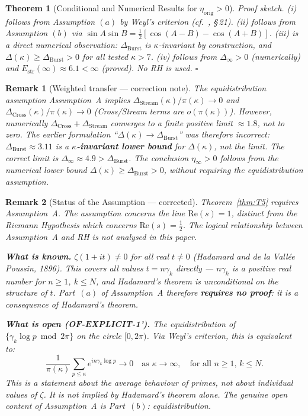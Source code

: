 \documentclass[11pt]{article}
\newtheorem{theorem}{Theorem}[section]
\newtheorem*{remark}{Remark}
\newcommand{\Estr}{E_{\mathrm{str}}}
\newcommand{\etaorig}{\eta_{\mathrm{orig}}}
\newcommand{\Dburstvar}{\Delta_{\mathrm{Burst}}}
\newcommand{\Dcross}{\Delta_{\mathrm{Cross}}}
\newcommand{\Dstream}{\Delta_{\mathrm{Stream}}}
\begin{document}
\begin{theorem}[Conditional and Numerical Results for $\etaorig > 0$]
\emph{Proof sketch.}
(i) follows from Assumption $(a)$ by Weyl's criterion
(cf.\ \cite{IK04}, \S\,21).
(ii) follows from Assumption $(b)$ via
$\sin A\sin B = \tfrac{1}{2}[\cos(A-B)-\cos(A+B)]$.
(iii) is a direct numerical observation: $\Dburstvar$ is $\kappa$-invariant
by construction, and $\Delta(\kappa)\geq\Dburstvar > 0$ for all tested
$\kappa > 7$.
(iv) follows from $\Delta_\infty > 0$ (numerically) and
$\Estr(\infty)\approx 6.1 < \infty$ (proved).
No RH is used. $\square$
\end{theorem}

\begin{remark}[Weighted transfer --- correction note]\label{rem:weighted-transfer}
The equidistribution assumption Assumption~A implies
$\Dstream(\kappa)/\pi(\kappa)\to 0$ and $\Dcross(\kappa)/\pi(\kappa)\to 0$
(Cross/Stream terms are $o(\pi(\kappa))$).
However, numerically $\Dcross + \Dstream$ converges to a finite positive
limit $\approx 1.8$, not to zero.
The earlier formulation ``$\Delta(\kappa)\to\Dburstvar$'' was therefore incorrect:
$\Dburstvar \approx 3.11$ is a \textbf{$\kappa$-invariant lower bound}
for $\Delta(\kappa)$, not the limit.
The correct limit is $\Delta_\infty \approx 4.9 > \Dburstvar$.
The conclusion $\eta_\infty > 0$ follows from the numerical lower bound
$\Delta(\kappa)\geq\Dburstvar > 0$, without requiring the equidistribution
assumption.
\end{remark}

\begin{remark}[Status of the Assumption --- corrected]\label{rem:assumption-status}
Theorem~\ref{thm:T5} requires Assumption~A.
The assumption concerns the line $\mathrm{Re}(s)=1$, distinct from the Riemann
Hypothesis which concerns $\mathrm{Re}(s)=\tfrac{1}{2}$.
The logical relationship between Assumption~A and RH is not analysed in this paper.

\textbf{What is known.}
$\zeta(1+it)\neq 0$ for all real $t\neq 0$
(Hadamard and de la Vall\'ee Poussin, 1896).
This covers \emph{all} values $t = n\gamma_k$ directly ---
$n\gamma_k$ is a positive real number for $n\geq 1$, $k\leq N$,
and Hadamard's theorem is unconditional on the structure of $t$.
Part~$(a)$ of Assumption~A therefore \textbf{requires no proof}: it is a
consequence of Hadamard's theorem.

\textbf{What is open (OF-EXPLICIT-1').}
The equidistribution of $\{\gamma_k\log p\bmod 2\pi\}$ on the circle $[0,2\pi)$.
Via Weyl's criterion, this is equivalent to:
\[
\frac{1}{\pi(\kappa)}\sum_{p\leq\kappa} e^{in\gamma_k\log p} \to 0
\quad\text{as }\kappa\to\infty,\quad\text{for all }n\geq 1,\,k\leq N.
\]
This is a statement about the \emph{average behaviour of primes},
not about individual values of $\zeta$.
It is not implied by Hadamard's theorem alone.
The genuine open content of Assumption~A is Part~$(b)$: equidistribution.
\end{remark}
\end{document}
